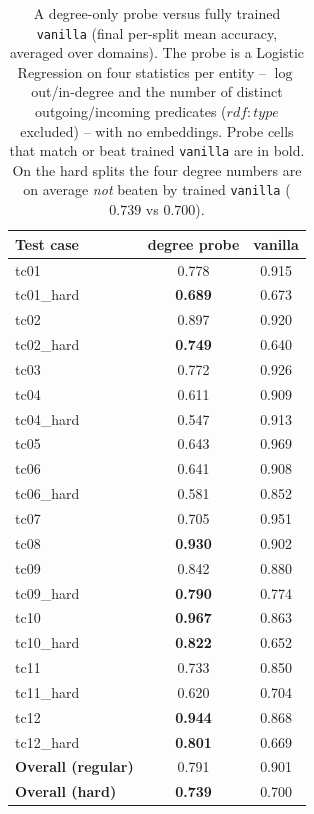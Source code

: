 \documentclass[a4paper,oneside,bibliography=totoc]{scrbook}
\begin{document}
\begin{table}[t]
\centering
\small
\caption{A degree-only probe versus fully trained \texttt{vanilla} (final
per-split mean accuracy, averaged over domains). The probe is a Logistic
Regression on four statistics per entity -- $\log$ out/in-degree and the number of
distinct outgoing/incoming predicates ($\mathit{rdf{:}type}$ excluded) -- with no
embeddings. Probe cells that match or beat trained \texttt{vanilla} are in bold.
On the hard splits the four degree numbers are on average \emph{not} beaten by
trained \texttt{vanilla} ($0.739$ vs $0.700$).}
\label{tab:dbpedia_degree_probe}
\begin{tabular}{lcc}
\toprule
\textbf{Test case} & \textbf{degree probe} & \textbf{vanilla} \\
\midrule
tc01       & 0.778 & 0.915 \\
tc01\_hard & \textbf{0.689} & 0.673 \\
tc02       & 0.897 & 0.920 \\
tc02\_hard & \textbf{0.749} & 0.640 \\
tc03       & 0.772 & 0.926 \\
tc04       & 0.611 & 0.909 \\
tc04\_hard & 0.547 & 0.913 \\
tc05       & 0.643 & 0.969 \\
tc06       & 0.641 & 0.908 \\
tc06\_hard & 0.581 & 0.852 \\
tc07       & 0.705 & 0.951 \\
tc08       & \textbf{0.930} & 0.902 \\
tc09       & 0.842 & 0.880 \\
tc09\_hard & \textbf{0.790} & 0.774 \\
tc10       & \textbf{0.967} & 0.863 \\
tc10\_hard & \textbf{0.822} & 0.652 \\
tc11       & 0.733 & 0.850 \\
tc11\_hard & 0.620 & 0.704 \\
tc12       & \textbf{0.944} & 0.868 \\
tc12\_hard & \textbf{0.801} & 0.669 \\
\midrule
\textbf{Overall (regular)} & 0.791 & 0.901 \\
\textbf{Overall (hard)}    & \textbf{0.739} & 0.700 \\
\bottomrule
\end{tabular}
\end{table}
\end{document}

